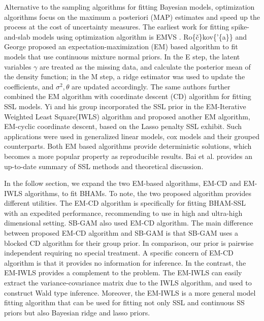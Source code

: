 \documentclass[AMA,STIX1COL,]{WileyNJD-v2}
\begin{document}
Alternative to the sampling algorithms for fitting Bayesian models,
optimization algorithms focus on the maximum a posteriori (MAP)
estimates and speed up the process at the cost of uncertainty measures.
The earliest work for fitting spike-and-slab models using optimization
algorithm is EMVS \citep{Rockova2014a}. Ro\{\v{c}\}kov\{'\{a\}\} and
George\citep{Rockova2014a} proposed an expectation-maximization (EM)
based algorithm to fit models that use continuous mixture normal priors.
In the E step, the latent variables \(\gamma\) are treated as the
missing data, and calculate the posterior mean of the density function;
in the M step, a ridge estimator was used to update the coefficients,
and \(\sigma^2, \theta\) are updated accordingly. The same authors
\citep{Rockova2018b, Rockova2018} further combined the EM algorithm with
coordinate descent (CD) algorithm for fitting SSL models. Yi and his
group incorporated the SSL prior in the EM-Iterative Weighted Least
Square(IWLS) algorithm and proposed another EM algorithm, EM-cyclic
coordinate descent, based on the Lasso penalty SSL exhibit. Such
applications were used in generalized linear models\citep{Tang2017a},
cox models \citep{Tang2017} and their grouped
counterparts\citep{Tang2018, Tang2019}. Both EM based algorithms provide
deterministic solutions, which becomes a more popular property as
reproducible results. Bai et al. \citep{Bai2020} provides an up-to-date
summary of SSL methods and theoretical discussion.

In the follow section, we expand the two EM-based algorithms, EM-CD and
EM-IWLS algorithms, to fit BHAMs. To note, the two proposed algorithm
provides different utilities. The EM-CD algorithm is specifically for
fitting BHAM-SSL with an expedited performance, recommending to use in
high and ultra-high dimensional setting. SB-GAM\citep{Bai2020, Bai2021}
also used EM-CD algorithm. The main difference between proposed EM-CD
algorithm and SB-GAM is that SB-GAM uses a blocked CD algorithm for
their group prior. In comparison, our prior is pairwise independent
requiring no special treatment. A specific concern of EM-CD algorithm is
that it provides no information for inference. In the contrast, the
EM-IWLS provides a complement to the problem. The EM-IWLS can easily
extract the variance-covariance matrix due to the IWLS algorithm, and
used to construct Wald type inference. Moreover, the EM-IWLS is a more
general model fitting algorithm that can be used for fitting not only
SSL and continuous SS priors but also Bayesian ridge and lasso priors.
\end{document}
